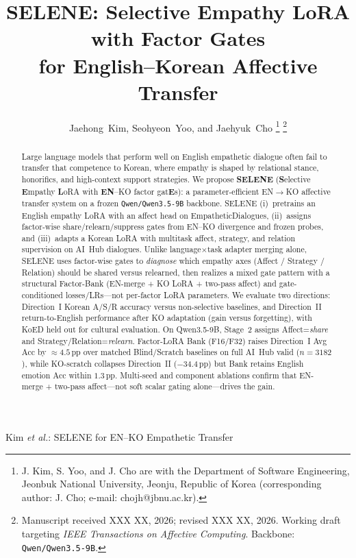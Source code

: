 \documentclass[journal]{IEEEtran}
\begin{document}
\title{SELENE: Selective Empathy LoRA with Factor Gates\\
for English--Korean Affective Transfer}

\author{Jaehong~Kim,
Seohyeon~Yoo,
and Jaehyuk~Cho%
\thanks{J. Kim, S. Yoo, and J. Cho are with the Department of Software Engineering,
Jeonbuk National University, Jeonju, Republic of Korea
(corresponding author: J. Cho; e-mail: chojh@jbnu.ac.kr).}%
\thanks{Manuscript received XXX XX, 2026; revised XXX XX, 2026.
Working draft targeting \textit{IEEE Transactions on Affective Computing}.
Backbone: \texttt{Qwen/Qwen3.5-9B}.}}

%
{Kim \MakeLowercase{\textit{et al.}}: SELENE for EN--KO Empathetic Transfer}


\maketitle

\begin{abstract}
Large language models that perform well on English empathetic dialogue often fail to transfer that competence to Korean, where empathy is shaped by relational stance, honorifics, and high-context support strategies.
We propose \textbf{SELENE} (\textbf{S}elective \textbf{E}mpathy \textbf{L}oRA with \textbf{EN}--KO factor gat\textbf{E}s): a parameter-efficient EN$\rightarrow$KO affective transfer system on a frozen \texttt{Qwen/Qwen3.5-9B} backbone.
SELENE (i)~pretrains an English empathy LoRA with an affect head on EmpatheticDialogues, (ii)~assigns factor-wise share/relearn/suppress gates from EN--KO divergence and frozen probes, and (iii)~adapts a Korean LoRA with multitask affect, strategy, and relation supervision on AI~Hub dialogues.
Unlike language$\times$task adapter merging alone, SELENE uses factor-wise gates to \emph{diagnose} which empathy axes (Affect / Strategy / Relation) should be shared versus relearned, then realizes a mixed gate pattern with a structural Factor-Bank (EN-merge + KO LoRA + two-pass affect) and gate-conditioned losses/LRs---not per-factor LoRA parameters.
We evaluate two directions: Direction~I Korean A/S/R accuracy versus non-selective baselines, and Direction~II return-to-English performance after KO adaptation (gain versus forgetting), with KoED held out for cultural evaluation.
On Qwen3.5-9B, Stage~2 assigns Affect=\textit{share} and Strategy/Relation=\textit{relearn}. Factor-LoRA Bank (F16/F32) raises Direction~I Avg Acc by ${\approx}4.5$\,pp over matched Blind/Scratch baselines on full AI~Hub valid ($n{=}3182$), while KO-scratch collapses Direction~II ($-34.4$\,pp) but Bank retains English emotion Acc within $1.3$\,pp. Multi-seed and component ablations confirm that EN-merge + two-pass affect---not soft scalar gating alone---drives the gain.
\end{abstract}
\end{document}

